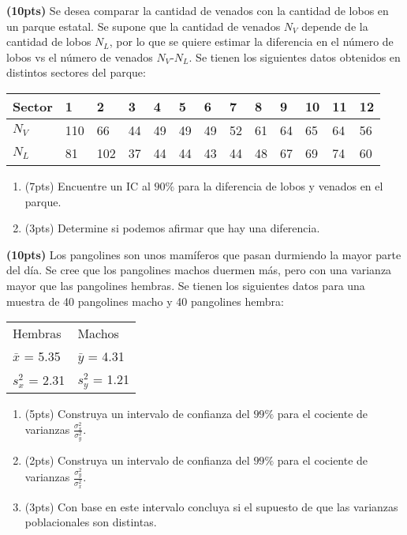\documentclass[addpoints]{exam}
\theoremstyle{mytheor}
\begin{document}
\begin{questions}
\question \textbf{(10pts)} Se desea comparar la cantidad de venados con la cantidad de lobos en un parque estatal. Se supone que la cantidad de venados $N_V$ depende de la cantidad de lobos $N_L$, por lo que se quiere estimar la diferencia en el número de lobos vs el número de venados $N_V$-$N_L$. Se tienen los siguientes datos obtenidos en distintos sectores del parque:

\begin{table}[h]
\centering
\begin{tabular}{lllllllllllll}
Sector & 1 & 2 & 3 & 4 & 5 & 6 & 7 & 8 & 9 & 10 & 11 & 12 \\ \hline
$N_V$ & 110 & 66 & 44 & 49 & 49 & 49 & 52 & 61 & 64 & 65 & 64 & 56 \\
$N_L$ & 81 & 102 & 37 & 44 & 44 & 43 & 44 & 48 & 67 & 69 & 74 & 60
\end{tabular}
\end{table}

\begin{enumerate}[label=\Alph*)]
\item (7pts) Encuentre un IC al $90\%$ para la diferencia de lobos y venados en el parque.
\item (3pts) Determine si podemos afirmar que hay una diferencia. 
\end{enumerate}


\question \textbf{(10pts)} Los pangolines son unos mamíferos que pasan durmiendo la mayor parte del día. Se cree que los pangolines machos duermen más, pero con una varianza mayor que las pangolines hembras. Se tienen los siguientes datos para una muestra de 40 pangolines macho y 40 pangolines hembra:

\begin{table}[h]
\centering
\begin{tabular}{ll}
Hembras & Machos \\
$\bar{x}$ = 5.35 & $\bar{y}$ = 4.31 \\
$s_x^2$ = 2.31 & $s_y^2$ = 1.21
\end{tabular}
\end{table}

\begin{enumerate}[label=\Alph*)]
\item (5pts) Construya un intervalo de confianza del $99\%$ para el cociente de varianzas $\frac{\sigma_x^2}{\sigma_y^2}$.
\item (2pts) Construya un intervalo de confianza del $99\%$ para el cociente de varianzas $\frac{\sigma_y^2}{\sigma_x^2}$.
\item (3pts) Con base en este intervalo concluya si el supuesto de que las varianzas poblacionales son distintas.
\end{enumerate}
 


\end{questions}
\end{document}
